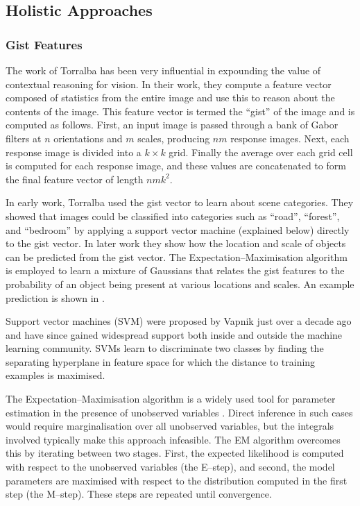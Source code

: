 \subsection{Holistic Approaches}

\subsubsection{Gist Features}
The work of Torralba \etal \cite{Torralba03} has been very influential
in expounding the value of contextual reasoning for vision. In their
work, they compute a feature vector composed of statistics from the
entire image and use this to reason about the contents of the
image. This feature vector is termed the ``gist'' of the image and is
computed as follows. First, an input image is passed through a bank of
Gabor filters at $n$ orientations and $m$ scales, producing $nm$
response images. Next, each response image is divided into a $k \times
k$ grid. Finally the average over each grid cell is computed for each
response image, and these values are concatenated to form the final
feature vector of length $nmk^2$.

In early work, Torralba \etal used the gist vector to learn about
scene categories. They showed that images could be classified into
categories such as ``road'', ``forest'', and ``bedroom'' by applying a
support vector machine (explained below) directly to the gist
vector. In later work \cite{Torralba03} they show how the location and
scale of objects can be predicted from the gist vector. The
Expectation--Maximisation algorithm \cite{Dempster77} is employed
to learn a mixture of Gaussians that relates the gist features to the
probability of an object being present at various locations and
scales. An example prediction is shown in .

Support vector machines (SVM) were proposed by Vapnik \cite{Vapnik95}
just over a decade ago and have since gained widespread support both
inside and outside the machine learning community. SVMs learn to
discriminate two classes by finding the separating hyperplane in
feature space for which the distance to training examples is
maximised.

The Expectation--Maximisation algorithm is a widely used tool for
parameter estimation in the presence of unobserved variables
\cite{Dempster77}. Direct inference in such cases would require
marginalisation over all unobserved variables, but the integrals
involved typically make this approach infeasible. The EM algorithm
overcomes this by iterating between two stages. First, the expected
likelihood is computed with respect to the unobserved variables (the
E--step), and second, the model parameters are maximised with respect
to the distribution computed in the first step (the M--step). These
steps are repeated until convergence.

